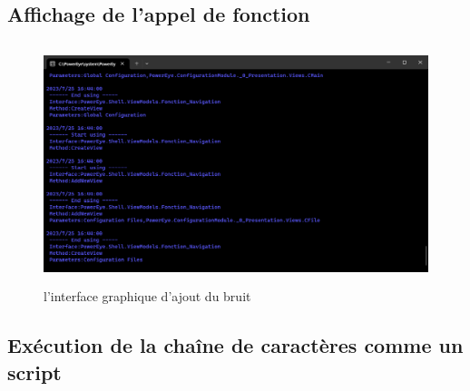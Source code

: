 \subsection{Affichage de l'appel de fonction}
\begin{figure}[H]
    \centering
    \includegraphics[height=7cm]{ressources/images/aop_log.png}
    \caption{l'interface graphique d'ajout du bruit}
\end{figure}
\subsection{Exécution de la chaîne de caractères comme un script}

